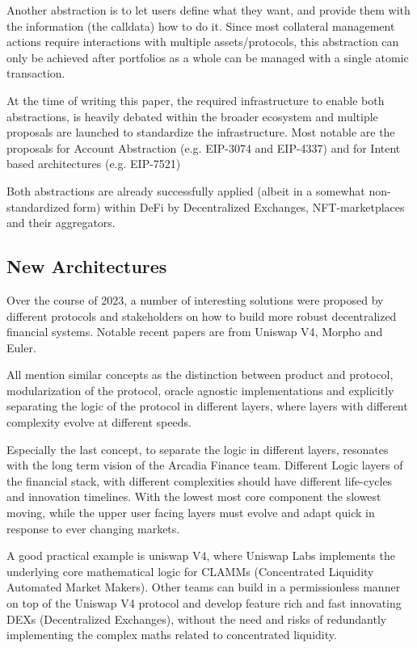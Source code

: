 \documentclass[sigconf,nonacm]{acmart}
\begin{document}
Another abstraction is to let users define what they want, and provide them with the information (the calldata) how to do it.
Since most collateral management actions require interactions with multiple assets/protocols,
this abstraction can only be achieved after portfolios as a whole can be managed with a single atomic transaction.

At the time of writing this paper, the required infrastructure to enable both abstractions, is heavily debated within the broader ecosystem and multiple proposals are launched to standardize the infrastructure.
Most notable are the proposals for Account Abstraction (e.g. EIP-3074 and EIP-4337) and for Intent based architectures (e.g. EIP-7521)

Both abstractions are already successfully applied (albeit in a somewhat non-standardized form) within DeFi by Decentralized Exchanges, NFT-marketplaces and their aggregators.

\subsection{New Architectures}
\label{subsec:new-architectures}
Over the course of 2023, a number of interesting solutions were proposed by different protocols and stakeholders on how to build more robust decentralized financial systems.
Notable recent papers are from Uniswap V4\cite{adams2023uniswap}, Morpho\cite{gontier2023morpho} and Euler\cite{euler2023protocols}.

All mention similar concepts as the distinction between product and protocol, modularization of the protocol,
oracle agnostic implementations and explicitly separating the logic of the protocol in different layers,
where layers with different complexity evolve at different speeds.

Especially the last concept, to separate the logic in different layers, resonates with the long term vision of the Arcadia Finance team.
Different Logic layers of the financial stack, with different complexities should have different life-cycles and innovation timelines.
With the lowest most core component the slowest moving, while the upper user facing layers must evolve and adapt quick in response to ever changing markets.

A good practical example is uniswap V4,
where Uniswap Labs implements the underlying core mathematical logic for CLAMMs (Concentrated Liquidity Automated Market Makers).
Other teams can build in a permissionless manner on top of the Uniswap V4 protocol and develop feature rich and fast innovating DEXs (Decentralized Exchanges),
without the need and risks of redundantly implementing the complex maths related to concentrated liquidity.
\end{document}
